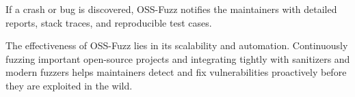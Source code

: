 If a crash or bug is discovered, OSS-Fuzz notifies the maintainers with detailed reports, stack traces, and reproducible test cases.

The effectiveness of OSS-Fuzz lies in its scalability and automation.
Continuously fuzzing important open-source projects and integrating tightly with sanitizers and modern fuzzers helps maintainers detect and fix vulnerabilities proactively before they are exploited in the wild.
